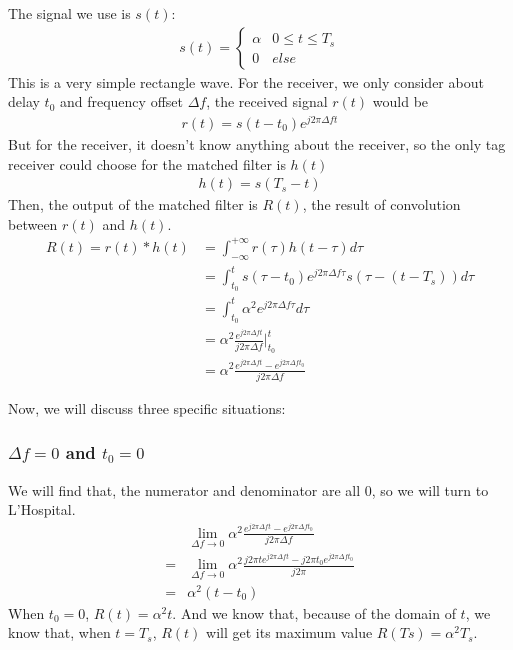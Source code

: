\documentclass[journal]{IEEEtran}
\begin{document}
The signal we use is $s(t)$:
\begin{align}
	s(t) = 
	\begin{cases}
		\alpha & 0 \leq t \leq T_s\\
		0 	   & else
	\end{cases}
\end{align}
This is a very simple rectangle wave.
For the receiver, we only consider about delay $t_0$ and frequency offset $\Delta f$, the received signal $r(t)$ would be
\begin{align}
	r(t) = s(t - t_0) e^{j 2 \pi \Delta f t}
\end{align}
But for the receiver, it doesn't know anything about the receiver, so the only tag receiver could choose for the matched filter is $h(t)$
\begin{align}
	h(t) = s(T_s - t)
\end{align}
Then, the output of the matched filter is $R(t)$, the result of convolution between $r(t)$ and $h(t)$. 
\begin{align}
	R(t) = r(t) \ast h(t) 
	&= \int_{-\infty}^{+\infty} r(\tau) h(t - \tau) d\tau\\
	&= \int_{t_0}^t s(\tau - t_0)e^{j 2 \pi \Delta f \tau} s(\tau - (t - T_s)) d \tau\\
	&= \int_{t_0}^t \alpha^2 e^{j 2 \pi \Delta f \tau} d \tau\\
	&= \alpha^2 \frac{e^{j 2 \pi \Delta f t}}{j 2\pi \Delta f} \bigg|_{t_0}^t\\
	&= \alpha^2 \frac{e^{j 2\pi \Delta f t} - e^{j 2\pi \Delta f t_0}}{j 2\pi \Delta f}
\end{align}

Now, we will discuss three specific situations:
\subsubsection{$\Delta f = 0$ and $t_0 = 0$} %
\label{ssub:no freq offset or delay}
We will find that, the numerator and denominator are all 0, so we will turn to L'Hospital.
\begin{align}
	 &\lim_{\Delta f \rightarrow 0} \alpha^2 \frac{e^{j 2\pi \Delta f t} - e^{j 2\pi \Delta f t_0}}{j 2\pi \Delta f}\\
	 =& \lim_{\Delta f \rightarrow 0} \alpha^2 \frac{j 2\pi t e^{j 2\pi \Delta f t} - j 2\pi t_0 e^{j 2\pi \Delta f t_0}}{j 2\pi}\\
	 =& \alpha^2(t - t_0)
\end{align}
When $t_0 = 0$, $R(t) = \alpha^2 t$.
And we know that, because of the domain of $t$, we know that, when $t = T_s$, $R(t)$ will get its maximum value $R(Ts) = \alpha^2 T_s$.
\end{document}
